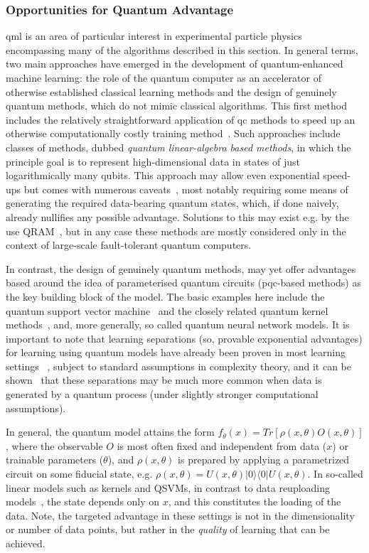 \subsubsection{Opportunities for Quantum Advantage}
\gls{qml} is an area of particular interest in experimental particle physics encompassing many of the algorithms described in this section. In general terms, two main approaches have emerged in the development of quantum-enhanced machine learning: the role of the quantum computer as an accelerator of otherwise established classical learning methods and the design of genuinely quantum methods, which do not mimic classical algorithms. This first method includes the relatively straightforward application of \gls{qc} methods to speed up an otherwise computationally costly training method~\cite{neven2008training}. Such approaches include classes of methods, dubbed \textit{quantum linear-algebra based methods}, in which the principle goal is to represent high-dimensional data in states of just logarithmically many qubits. This approach may allow even exponential speed-ups but comes with numerous caveats~\cite{Aaronson:2015scy}, most notably requiring some means of generating the required data-bearing quantum states, which, if done naively, already nullifies any possible advantage. Solutions to this may exist e.g. by the use QRAM~\cite{PhysRevLett.100.160501}, but in any case  these methods are mostly considered only in the context of large-scale fault-tolerant quantum computers.

In contrast, the design of genuinely quantum methods, may yet offer advantages based around the idea of parameterised quantum circuits (\gls{pqc}-based methods) as the key building block of the model. The basic examples here include the quantum support vector machine~\cite{havlivcek2019supervised} and the closely related quantum kernel methods~\cite{Schuld2019QML},  and, more generally, so called quantum neural network models. It is important to note that learning separations (so, provable exponential advantages) for learning using quantum models have already been proven in most learning settings ~\cite{liu2021rigorous}, subject to standard assumptions in complexity theory, and it can be shown~\cite{Gyurik:2022iqm} that these separations may be much more common when data is generated by a quantum process (under slightly stronger computational assumptions).

In general, the quantum model attains the form  $f_{\theta}(x)=Tr[\rho(x,\theta) O(x,\theta)]$, where the observable $O$ is most often fixed and independent from data ($x$) or trainable parameters ($\theta$), and $\rho(x,\theta)$ is prepared by applying a parametrized circuit on some fiducial state, e.g. $\rho(x,\theta) = U(x,\theta) |0\rangle \langle 0| U(x,\theta)$. In so-called linear models such as kernels and QSVMs, in contrast to data reuploading models~\cite{P_rez_Salinas_2020}, the state depends only on $x$, and this constitutes the loading of the data. Note, the targeted advantage in these settings is not in the dimensionality or number of data points, but rather in the \emph{quality} of learning that can be achieved. 

